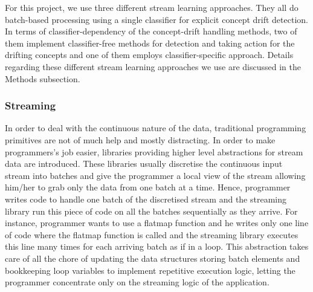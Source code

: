 \documentclass[12pt]{article}
\begin{document}
For this project, we use three different stream learning approaches. They all do batch-based processing using a single classifier for explicit concept drift detection. In terms of classifier-dependency of the concept-drift handling methods, two of them implement classifier-free methods for detection and taking action for the drifting concepts and one of them employs classifier-specific approach. Details regarding these different stream learning approaches we use are discussed in the Methods subsection.


\subsubsection{Streaming}
In order to deal with the continuous nature of the data, traditional programming primitives are not of much help and mostly distracting. In order to make programmers’s job easier, libraries providing higher level abstractions for stream data are introduced. These libraries usually discretise the continuous input stream into batches and give the programmer a local view of the stream allowing him/her to grab only the data from one batch at a time. Hence, programmer writes code to handle one batch of the discretised stream and the streaming library run this piece of code on all the batches sequentially as they arrive. For instance, programmer wants to use a flatmap function and he writes only one line of code where the flatmap function is called and the streaming library executes this line many times for each arriving batch as if in a loop. This abstraction takes care of all the chore of updating the data structures storing batch elements and bookkeeping loop variables to implement repetitive execution logic, letting the programmer concentrate only on the streaming logic of the application. 
\end{document}
